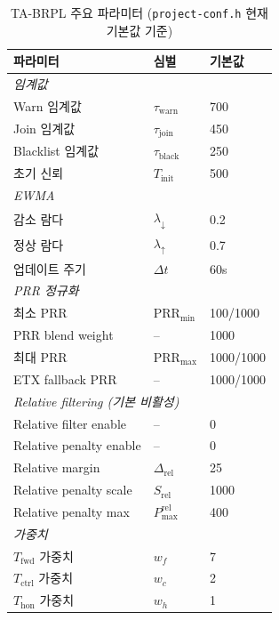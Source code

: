 \documentclass[12pt,a4paper]{article}
\begin{document}
\begin{table}[t]
  \centering
  \caption{TA-BRPL 주요 파라미터 (\texttt{project-conf.h} 현재 기본값 기준)}
  \label{tab:params}
  \begin{tabular}{lll}
    \toprule
    파라미터 & 심벌 & 기본값 \\
    \midrule
    \multicolumn{3}{l}{\textit{임계값}} \\
    Warn 임계값       & $\tau_\text{warn}$    & 700 \\
    Join 임계값       & $\tau_\text{join}$    & 450 \\
    Blacklist 임계값  & $\tau_\text{black}$   & 250 \\
    초기 신뢰         & $T_\text{init}$       & 500 \\
    \midrule
    \multicolumn{3}{l}{\textit{EWMA}} \\
    감소 람다         & $\lambda_\downarrow$  & 0.2 \\
    정상 람다         & $\lambda_\uparrow$    & 0.7 \\
    업데이트 주기     & $\Delta t$            & 60s \\
    \midrule
    \multicolumn{3}{l}{\textit{PRR 정규화}} \\
    최소 PRR          & $\mathrm{PRR}_{\min}$ & 100/1000 \\
    PRR blend weight  & --                    & 1000 \\
    최대 PRR          & $\mathrm{PRR}_{\max}$ & 1000/1000 \\
    ETX fallback PRR  & --                    & 1000/1000 \\
    \midrule
    \multicolumn{3}{l}{\textit{Relative filtering (기본 비활성)}} \\
    Relative filter enable  & -- & 0 \\
    Relative penalty enable & -- & 0 \\
    Relative margin         & $\Delta_\text{rel}$ & 25 \\
    Relative penalty scale  & $S_\text{rel}$ & 1000 \\
    Relative penalty max    & $P^\text{rel}_\text{max}$ & 400 \\
    \midrule
    \multicolumn{3}{l}{\textit{가중치}} \\
    $T_\text{fwd}$ 가중치   & $w_f$      & 7 \\
    $T_\text{ctrl}$ 가중치  & $w_c$      & 2 \\
    $T_\text{hon}$ 가중치   & $w_h$      & 1 \\

\end{tabular}
\end{table}
\end{document}
